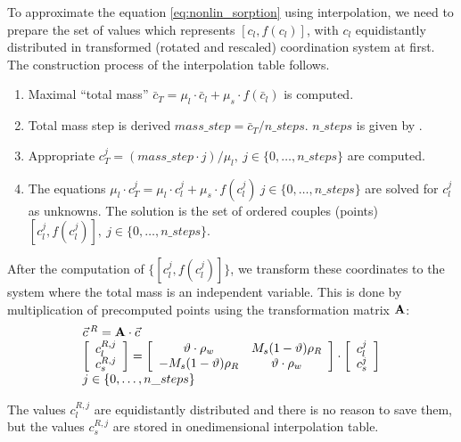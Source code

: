 To approximate the equation \eqref{eq:nonlin_sorption} using interpolation, we need to prepare the set of values 
which represents $[c_l, f(c_l)]$, with $c_l$ equidistantly distributed in transformed (rotated and rescaled) 
coordination system at first. The construction process of the interpolation table follows.
\begin{enumerate}
 \item Maximal ``total mass'' $\bar{c}_T = \mu_l\cdot \bar{c}_l + \mu_s\cdot f(\bar{c}_l)$ is computed.
 \item Total mass step is derived $mass\_step = \bar{c}_T/n\_steps$. $n\_steps$ is given by
       .
 \item Appropriate $c_T^j = (mass\_step\cdot j)/\mu_l,~j\in \{0,\ldots, n\_steps\}$ are computed. 
 \item The equations $\mu_l \cdot c_T^j = \mu_l\cdot c_l^j + \mu_s\cdot f(c_l^j)~j\in \{0,\ldots, n\_steps\}$ are solved 
       for $c_l^j$ as unknowns. The solution is the set of ordered couples (points) 
       $[c_l^j,f(c_l^j)],~j\in\{0,\ldots,n\_steps\}$.
\end{enumerate}
After the computation of $\{[c_l^j,f(c_l^j)]\}$, we transform these coordinates to the system where the total mass is 
an independent variable. This is done by multiplication of precomputed points using the transformation matrix ${\bf A}$:
\begin{equation}
 \begin{array}{l}
  \vec{c}\,^R = {\bf A}\cdot\vec{c}\\
  \left[\begin{array}{c} c_l^{R,j}\\ c_s^{R,j} \end{array}\right] = 
  \left[\begin{array}{cc}
    \vartheta\cdot \rho_w & M_s(1 - \vartheta)\rho_R\\
    -M_s(1 - \vartheta)\rho_R & \vartheta\cdot \rho_w
  \end{array}\right]\cdot
  \left[\begin{array}{c} c_l^j\\ c_s^j \end{array}\right]\\
  j\in\{0,\ldots,n\_steps\}
 \end{array}
 \label{eq:transf_mat}
\end{equation}

The values $c_l^{R,j}$ are equidistantly distributed and there is no reason to save them, but the values 
$c_s^{R,j}$ are stored in onedimensional interpolation table.


